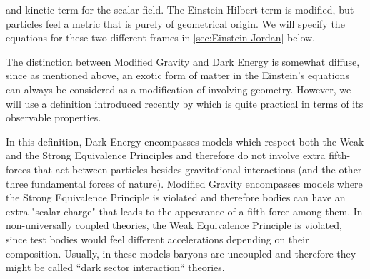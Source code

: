 and kinetic term for the scalar field. 
The Einstein-Hilbert term is modified, but particles feel a metric that is purely of geometrical origin. 
We will specify the equations for these two different frames in
\cref{sec:Einstein-Jordan} below.


The distinction between Modified Gravity and Dark Energy is somewhat diffuse, since as mentioned above, 
an exotic form of matter in the Einstein's equations can always be considered as a modification 
of involving geometry. However, we will use a definition introduced recently by \cite{cite Joyce, Lombrisier, Schmidt}
which is quite practical in terms of its observable properties. 

In this definition, Dark Energy encompasses models which respect both the Weak and the Strong Equivalence
Principles and therefore do not involve extra fifth-forces that act between particles besides gravitational 
interactions (and the other three fundamental forces of nature). 
Modified Gravity encompasses models where the Strong Equivalence Principle is violated and therefore 
bodies can have an extra "scalar charge" that leads to the appearance of a fifth force among them.
In non-universally coupled theories, the Weak Equivalence Principle is violated,
since test bodies would feel different accelerations depending on
their composition. Usually, in these models baryons are uncoupled and therefore they might be called ``dark sector interaction`` theories.


